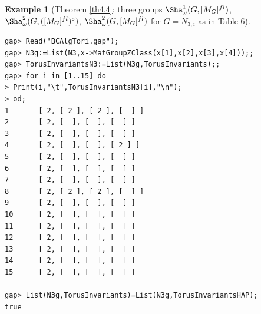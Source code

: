 \documentclass{amsart}
\theoremstyle{plain}
\theoremstyle{definition}
\newtheorem{example}[theorem]{Example}
\theoremstyle{remark}
\begin{document}
\bigskip
\begin{example}[{Theorem \ref{th4.4}: three groups $\Sha^1_\omega(G,[M_G]^{fl})$, $\Sha^2_\omega(G,([M_G]^{fl})^\circ)$, $\Sha^2_\omega(G,[M_G]^{fl})$ for $G=N_{3,i}$ as in Table $6$}]\label{exTI-N3}~\vspace*{-5mm}\\
\begin{verbatim}
gap> Read("BCAlgTori.gap");
gap> N3g:=List(N3,x->MatGroupZClass(x[1],x[2],x[3],x[4]));;
gap> TorusInvariantsN3:=List(N3g,TorusInvariants);;
gap> for i in [1..15] do
> Print(i,"\t",TorusInvariantsN3[i],"\n");
> od;
1       [ 2, [ 2 ], [ 2 ], [  ] ]
2       [ 2, [  ], [  ], [  ] ]
3       [ 2, [  ], [  ], [  ] ]
4       [ 2, [  ], [  ], [ 2 ] ]
5       [ 2, [  ], [  ], [  ] ]
6       [ 2, [  ], [  ], [  ] ]
7       [ 2, [  ], [  ], [  ] ]
8       [ 2, [ 2 ], [ 2 ], [  ] ]
9       [ 2, [  ], [  ], [  ] ]
10      [ 2, [  ], [  ], [  ] ]
11      [ 2, [  ], [  ], [  ] ]
12      [ 2, [  ], [  ], [  ] ]
13      [ 2, [  ], [  ], [  ] ]
14      [ 2, [  ], [  ], [  ] ]
15      [ 2, [  ], [  ], [  ] ]

gap> List(N3g,TorusInvariants)=List(N3g,TorusInvariantsHAP);
true
\end{verbatim}
\end{example}
\end{document}
